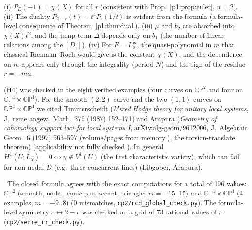 \begin{rem}[Properties\ \tP]
(i) $P_E(-1)=\chi(X)$ for all $r$ (consistent with Prop.~\ref{p1:prop:euler}, $n=2$). (ii) The duality $P_{2-r}(t)=t^4P_r(1/t)$ is evident from the formula (a formula-level consequence of Theorem~\ref{p1:thm:dual}). (iii) $\mu$ and $b_2$ are absorbed into $\chi(X)t^2$, and the jump term $\Delta$ depends only on $b_1$ (the number of linear relations among the $[D_i]$). (iv) For $E=L_0^m$, the quasi-polynomial in $m$ that classical Riemann--Roch would give is the constant $\chi(X)$, and the dependence on $m$ appears only through the integrality (period $N$) and the sign of the residue $r=-ma$.
\end{rem}
\begin{rem}[\tQ\ On G2]
(H4) was checked in the eight verified examples (four curves on $\mathbb{CP}^2$ and four on $\mathbb{CP}^1\times\mathbb{CP}^1$). For the smooth $(2,2)$ curve and the two $(1,1)$ curves on $\mathbb{CP}^1\times\mathbb{CP}^1$ we cited Timmerscheidt (\emph{Mixed Hodge theory for unitary local systems}, J.\ reine angew.\ Math.\ 379 (1987) 152--171) and Arapura (\emph{Geometry of cohomology support loci for local systems I}, arXiv:alg-geom/9612006, J.\ Algebraic Geom.\ 6 (1997) 563--597 (volume/pages from memory \tQ), the torsion-translate theorem) (applicability not fully checked \tQ). In general $H^1(U;L_\chi)=0\Leftrightarrow\chi\notin V^1(U)$ (the first characteristic variety), which can fail for non-nodal $D$ (e.g.\ three concurrent lines) (Libgober, Arapura).
\end{rem}
\tV\ The closed formula agrees with the exact computations for a total of 196 values: $\mathbb{CP}^2$ (smooth, nodal, conic plus secant, triangle; $m=-15..15$) and $\mathbb{CP}^1\times\mathbb{CP}^1$ (4 examples, $m=-9..8$) (0 mismatches, \texttt{cp2/ncd\_global\_check.py}). The formula-level symmetry $r\leftrightarrow2-r$ was checked on a grid of 73 rational values of $r$ (\texttt{cp2/serre\_rr\_check.py}).

